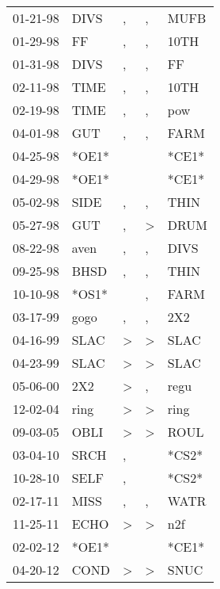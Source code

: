 \begin{supertabular}{lllll}
 01-21-98 &   DIVS &             , &             , &   MUFB \\
 01-29-98 &     FF &             , &             , &   10TH \\
 01-31-98 &   DIVS &             , &             , &     FF \\
 02-11-98 &   TIME &             , &             , &   10TH \\
 02-19-98 &   TIME &             , &             , &    pow \\
 04-01-98 &    GUT &             , &             , &   FARM \\
 04-25-98 &  *OE1* &               &               &  *CE1* \\
 04-29-98 &  *OE1* &               &               &  *CE1* \\
 05-02-98 &   SIDE &             , &             , &   THIN \\
 05-27-98 &    GUT &             , &  \textgreater &   DRUM \\
 08-22-98 &   aven &             , &             , &   DIVS \\
 09-25-98 &   BHSD &             , &             , &   THIN \\
 10-10-98 &  *OS1* &               &             , &   FARM \\
 03-17-99 &   gogo &             , &             , &    2X2 \\
 04-16-99 &   SLAC &  \textgreater &  \textgreater &   SLAC \\
 04-23-99 &   SLAC &  \textgreater &  \textgreater &   SLAC \\
 05-06-00 &    2X2 &  \textgreater &             , &   regu \\
 12-02-04 &   ring &  \textgreater &  \textgreater &   ring \\
 09-03-05 &   OBLI &  \textgreater &  \textgreater &   ROUL \\
 03-04-10 &   SRCH &             , &               &  *CS2* \\
 10-28-10 &   SELF &             , &               &  *CS2* \\
 02-17-11 &   MISS &             , &             , &   WATR \\
 11-25-11 &   ECHO &  \textgreater &  \textgreater &    n2f \\
 02-02-12 &  *OE1* &               &               &  *CE1* \\
 04-20-12 &   COND &  \textgreater &  \textgreater &   SNUC \\
\end{supertabular}
